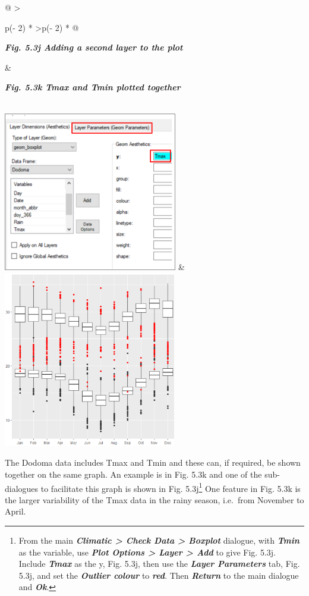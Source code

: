 \documentclass[
  letterpaper,
  DIV=11,
  numbers=noendperiod]{scrreprt}
\begin{document}
\begin{longtable}[]{@{}
  >{\raggedright\arraybackslash}p{(\columnwidth - 2\tabcolsep) * }
  >{\raggedleft\arraybackslash}p{(\columnwidth - 2\tabcolsep) * }@{}}
\toprule\noalign{}
\begin{minipage}[b]{\linewidth}\raggedright
\textbf{\emph{Fig. 5.3j Adding a second layer to the plot}}
\end{minipage} & \begin{minipage}[b]{\linewidth}\raggedleft
\textbf{\emph{Fig. 5.3k Tmax and Tmin plotted together}}
\end{minipage} \\
\midrule\noalign{}
\endhead
\bottomrule\noalign{}
\endlastfoot
\includegraphics[width=2.99244in,height=2.74434in]{figures/Fig5.3j.png}
&
\includegraphics[width=2.97089in,height=3.03358in]{figures/Fig5.3k.png} \\
\end{longtable}

The Dodoma data includes Tmax and Tmin and these can, if required, be
shown together on the same graph. An example is in Fig. 5.3k and one of
the sub-dialogues to facilitate this graph is shown in Fig.
5.3j\footnote{From the main \textbf{\emph{Climatic \textgreater{} Check
  Data \textgreater{} Boxplot}} dialogue, with \textbf{\emph{Tmin}} as
  the variable, use \textbf{\emph{Plot Options \textgreater{} Layer
  \textgreater{} Add}} to give Fig. 5.3j. Include \textbf{\emph{Tmax}}
  as the y, Fig. 5.3j, then use the \textbf{\emph{Layer Parameters}}
  tab, Fig. 5.3j, and set the \textbf{\emph{Outlier colour}} to
  \textbf{\emph{red}}. Then \textbf{\emph{Return}} to the main dialogue
  and \textbf{\emph{Ok}}.} One feature in Fig. 5.3k is the larger
variability of the Tmax data in the rainy season, i.e.~from November to
April.
\end{document}

